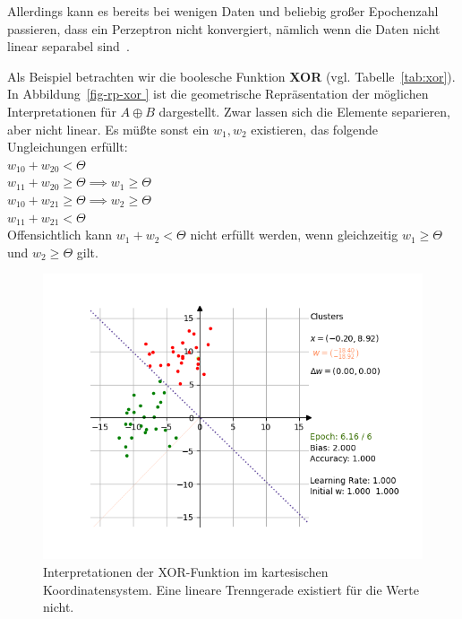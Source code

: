 \noindent
Allerdings kann es bereits bei wenigen Daten und beliebig großer Epochenzahl passieren, dass ein Perzeptron nicht konvergiert, nämlich wenn die Daten nicht linear separabel sind~\cite[20]{Arb03}.

Als Beispiel betrachten wir die boolesche Funktion \textbf{XOR} (vgl. Tabelle~\ref{tab:xor}). In Abbildung~\ref{fig-rp-xor } ist die geometrische Repräsentation der möglichen Interpretationen für $A \oplus B$ dargestellt.
Zwar lassen sich die Elemente separieren, aber nicht linear.
Es müßte sonst ein $w_1, w_2$ existieren, das folgende Ungleichungen erfüllt:\\


$w_10 + w_20 < \Theta$\\

$w_11 + w_20 \geq \Theta \implies w_1 \geq \Theta$\\

$w_10 + w_21 \geq \Theta \implies w_2 \geq \Theta$\\

$w_11 + w_21 < \Theta$\\

\noindent
Offensichtlich kann $w_1 + w_2 < \Theta$ nicht erfüllt werden, wenn gleichzeitig $w_1 \geq \Theta$ und $w_2 \geq \Theta$ gilt.

\begin{figure}[h]
    \centering
    \includegraphics{images/rosenblatt/blob_success.png}
    \caption{Interpretationen der XOR-Funktion im kartesischen Koordinatensystem. Eine lineare Trenngerade existiert für die Werte nicht.}
    \label{fig-rp-xor}
\end{figure}

